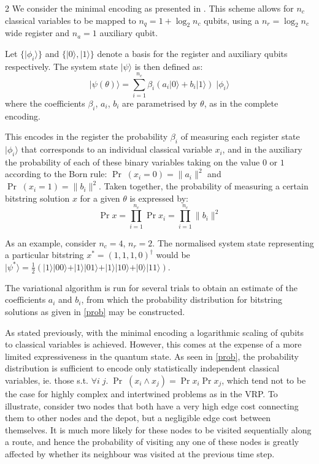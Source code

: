 \documentclass [10pt]{article}
\newcommand {\qvec}[1] {\vert #1 \rangle}
\newcommand {\qnorm}[1] {\lVert #1 \rVert}
\begin{document}
\begin {multicols}{2}
We consider the minimal encoding as presented in \cite{effbinopt}. This scheme
allows for $n_c$ classical variables to be mapped to $n_q = 1 + \log_2 n_c$
qubits, using a $n_r = \log_2 n_c$ wide register and $n_a = 1$ auxiliary
qubit.

Let $\{\qvec{\phi_i}\}$ and $\{\qvec{0}, \qvec{1}\}$ denote a basis for the
register and auxiliary qubits respectively. The system state $\qvec{\psi}$ is
then defined as:
\begin {equation}
\qvec{\psi(\theta)} = \sum_{i=1}^{n_c} \beta_i
(a_i \qvec{0} + b_i \qvec{1}) \; \qvec{\phi_i}
\end {equation}
where the coefficients $\beta_i$, $a_i$, $b_i$ are parametrised by $\theta$,
as in the complete encoding.

This encodes in the register the probability $\beta_i$ of measuring each
register state $\qvec{\phi_i}$ that corresponds to an individual classical
variable $x_i$, and in the auxiliary the probability of each of these binary
variables taking on the value $0$ or $1$ according to the Born rule:
$\Pr \; (x_i = 0) = \qnorm{a_i}^2$ and $\Pr \; (x_i = 1) = \qnorm{b_i}^2$.
Taken together, the probability of measuring a certain bitstring solution
$x$ for a given $\theta$ is expressed by:
\begin {equation}
\label {prob}
\Pr x = \prod_{i=1}^{n_c} \Pr x_i = \prod_{i=1}^{n_c} \qnorm{b_i}^2
\end {equation}

As an example, consider $n_c = 4$, $n_r = 2$. The normalised system
state representing a particular bitstring $x^* = (1, 1, 1, 0)^\dag$
would be $\qvec{\psi^*} = \frac{1}{2}(\qvec{1}\qvec{00} + \qvec{1}\qvec{01}
+ \qvec{1}\qvec{10} + \qvec{0}\qvec{11})$.

The variational algorithm is run for several trials to obtain an estimate
of the coefficients $a_i$ and $b_i$, from which the probability distribution
for bitstring solutions as given in \eqref{prob} may be constructed.

As stated previously, with the minimal encoding a logarithmic scaling of
qubits to classical variables is achieved. However, this comes at the
expense of a more limited expressiveness in the quantum state. As seen in
\eqref{prob}, the probability distribution is sufficient to encode only
statistically independent classical variables, ie. those s.t.
$\forall i \; j. \; \Pr \; (x_i \land x_j) = \Pr x_i \Pr x_j$, which tend
not to be the case for highly complex and intertwined problems as in the VRP.
To illustrate, consider two nodes that both have a very high edge cost
connecting them to other nodes and the depot, but a negligible edge cost
between themselves. It is much more likely for these nodes to be visited
sequentially along a route, and hence the probability of visiting any one of
these nodes is greatly affected by whether its neighbour was visited at the
previous time step.


\end{multicols}
\end{document}

